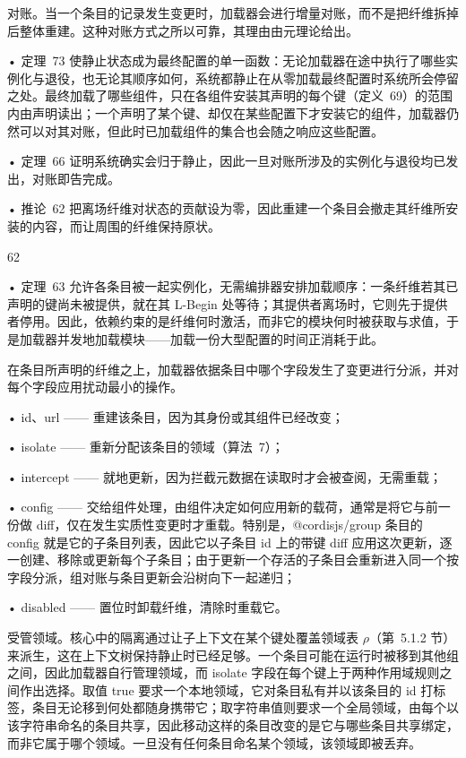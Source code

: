 对账。当一个条目的记录发生变更时，加载器会进行增量对账，而不是把纤维拆掉后整体重建。这种对账方式之所以可靠，其理由由元理论给出。

• 定理~73 使静止状态成为最终配置的单一函数：无论加载器在途中执行了哪些实例化与退役，也无论其顺序如何，系统都静止在从零加载最终配置时系统所会停留之处。最终加载了哪些组件，只在各组件安装其声明的每个键（定义~69）的范围内由声明读出；一个声明了某个键、却仅在某些配置下才安装它的组件，加载器仍然可以对其对账，但此时已加载组件的集合也会随之响应这些配置。

• 定理~66 证明系统确实会归于静止，因此一旦对账所涉及的实例化与退役均已发出，对账即告完成。

• 推论~62 把离场纤维对状态的贡献设为零，因此重建一个条目会撤走其纤维所安装的内容，而让周围的纤维保持原状。

62

• 定理~63 允许各条目被一起实例化，无需编排器安排加载顺序：一条纤维若其已声明的键尚未被提供，就在其 L-Begin 处等待；其提供者离场时，它则先于提供者停用。因此，依赖约束的是纤维何时激活，而非它的模块何时被获取与求值，于是加载器并发地加载模块——加载一份大型配置的时间正消耗于此。

在条目所声明的纤维之上，加载器依据条目中哪个字段发生了变更进行分派，并对每个字段应用扰动最小的操作。

• id、url —— 重建该条目，因为其身份或其组件已经改变；

• isolate —— 重新分配该条目的领域（算法~7）；

• intercept —— 就地更新，因为拦截元数据在读取时才会被查阅，无需重载；

• config —— 交给组件处理，由组件决定如何应用新的载荷，通常是将它与前一份做 diff，仅在发生实质性变更时才重载。特别是，@cordisjs/group 条目的 config 就是它的子条目列表，因此它以子条目 id 上的带键 diff 应用这次更新，逐一创建、移除或更新每个子条目；由于更新一个存活的子条目会重新进入同一个按字段分派，组对账与条目更新会沿树向下一起递归；

• disabled —— 置位时卸载纤维，清除时重载它。

受管领域。核心中的隔离通过让子上下文在某个键处覆盖领域表 \(\rho\)（第~5.1.2 节）来派生，这在上下文树保持静止时已经足够。一个条目可能在运行时被移到其他组之间，因此加载器自行管理领域，而 isolate 字段在每个键上于两种作用域规则之间作出选择。取值 true 要求一个本地领域，它对条目私有并以该条目的 id 打标签，条目无论移到何处都随身携带它；取字符串值则要求一个全局领域，由每个以该字符串命名的条目共享，因此移动这样的条目改变的是它与哪些条目共享绑定，而非它属于哪个领域。一旦没有任何条目命名某个领域，该领域即被丢弃。

